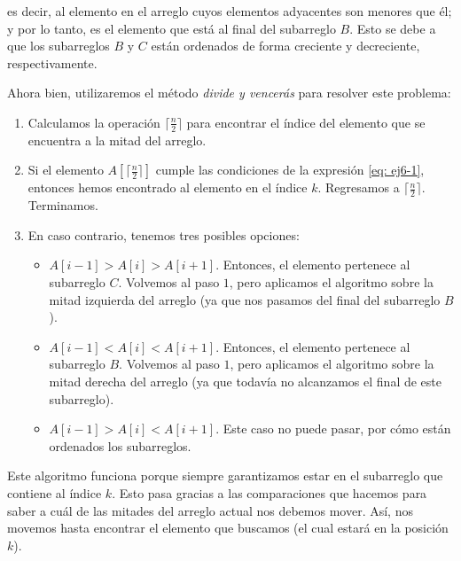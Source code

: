 \documentclass[letterpaper,11pt]{article}
\begin{document}
\begin{enumerate}
\begin{enumerate}
        es decir, al elemento en el arreglo cuyos elementos adyacentes son 
        menores que él; y por lo tanto, es el elemento que está al final del 
        subarreglo $B$. Esto se debe a que los subarreglos $B$ y $C$ están 
        ordenados de forma creciente y decreciente, respectivamente. 
        
        Ahora bien, utilizaremos el método \textit{divide y vencerás} para 
        resolver este problema: 
        \begin{enumerate}
            \item Calculamos la operación $\lceil \frac{n}{2} \rceil$ para 
            encontrar el índice del elemento que se encuentra a la mitad del 
            arreglo. 

            \item Si el elemento $A[\lceil \frac{n}{2} \rceil]$ cumple las 
            condiciones de la expresión \ref{eq: ej6-1}, entonces hemos 
            encontrado al elemento en el índice $k$. Regresamos a
            $\lceil \frac{n}{2} \rceil$. Terminamos.

            \item En caso contrario, tenemos tres posibles opciones:
            \begin{itemize}
                \item $A[i-1] > A[i] > A[i+1]$. Entonces, el elemento pertenece 
                al subarreglo $C$. Volvemos al paso $1$, pero aplicamos el 
                algoritmo sobre la mitad izquierda del arreglo (ya que nos 
                pasamos del final del subarreglo $B$).

                \item $A[i-1] < A[i] < A[i+1]$. Entonces, el elemento pertenece 
                al subarreglo $B$. Volvemos al paso $1$, pero aplicamos el 
                algoritmo sobre la mitad derecha del arreglo (ya que todavía no
                alcanzamos el final de este subarreglo).

                \item $A[i-1] > A[i] < A[i+1]$. Este caso no puede pasar, por 
                cómo están ordenados los subarreglos.
            \end{itemize}
        \end{enumerate}

        Este algoritmo funciona porque siempre garantizamos estar en el 
        subarreglo que contiene al índice $k$. Esto pasa gracias a las 
        comparaciones que hacemos para saber a cuál de las mitades del arreglo 
        actual nos debemos mover. Así, nos movemos hasta encontrar el 
        elemento que buscamos (el cual estará en la posición $k$).


\end{enumerate}
\end{enumerate}
\end{document}
